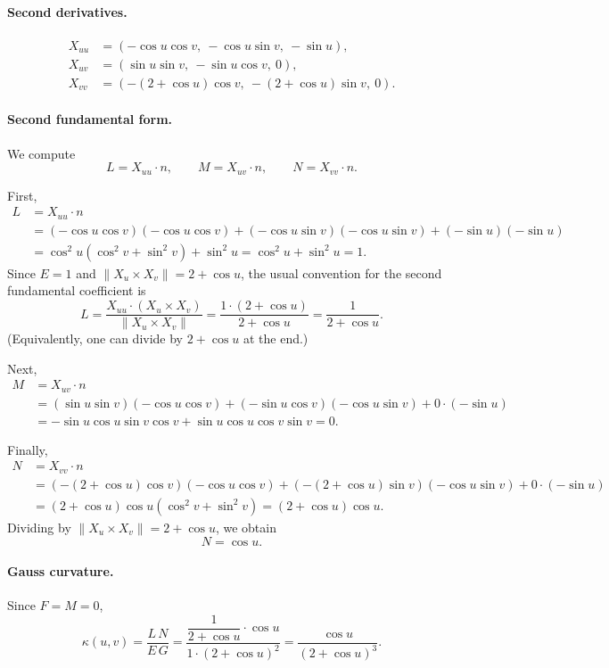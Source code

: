 \documentclass[12pt,a4paper]{article}
\theoremstyle{plain}
\theoremstyle{definition}      %
\begin{document}
\paragraph{Second derivatives.}
\[
\begin{aligned}
	X_{uu} &= (-\cos u\cos v,\ -\cos u\sin v,\ -\sin u),\\[1mm]
	X_{uv} &= (\sin u\sin v,\ -\sin u\cos v,\ 0),\\[1mm]
	X_{vv} &= (-(2+\cos u)\cos v,\ -(2+\cos u)\sin v,\ 0).
\end{aligned}
\]

\paragraph{Second fundamental form.}
We compute
\[
L = X_{uu}\cdot n,\qquad
M = X_{uv}\cdot n,\qquad
N = X_{vv}\cdot n.
\]

First,
\[
\begin{aligned}
	L
	&= X_{uu}\cdot n \\
	&= (-\cos u\cos v)(-\cos u\cos v)
	+(-\cos u\sin v)(-\cos u\sin v)
	+(-\sin u)(-\sin u) \\
	&= \cos^2u(\cos^2v+\sin^2v)+\sin^2u
	= \cos^2u+\sin^2u=1.
\end{aligned}
\]
Since $E=1$ and $\|X_u\times X_v\|=2+\cos u$, the usual convention for
the second fundamental coefficient is
\[
L = \frac{X_{uu}\cdot (X_u\times X_v)}{\|X_u\times X_v\|}
= \frac{1\cdot (2+\cos u)}{2+\cos u}
= \frac{1}{2+\cos u}.
\]
(Equivalently, one can divide by $2+\cos u$ at the end.)

Next,
\[
\begin{aligned}
	M
	&= X_{uv}\cdot n \\
	&= (\sin u\sin v)(-\cos u\cos v)
	+(-\sin u\cos v)(-\cos u\sin v)
	+0\cdot (-\sin u) \\
	&= -\sin u\cos u\sin v\cos v
	+\sin u\cos u\cos v\sin v
	= 0.
\end{aligned}
\]

Finally,
\[
\begin{aligned}
	N
	&= X_{vv}\cdot n \\
	&= (-(2+\cos u)\cos v)(-\cos u\cos v)
	+ (-(2+\cos u)\sin v)(-\cos u\sin v)
	+ 0\cdot(-\sin u) \\
	&= (2+\cos u)\cos u(\cos^2v+\sin^2v)
	= (2+\cos u)\cos u.
\end{aligned}
\]
Dividing by $\|X_u\times X_v\|=2+\cos u$, we obtain
\[
N = \cos u.
\]

\paragraph{Gauss curvature.}
Since $F=M=0$,
\[
\kappa(u,v) = \frac{L\,N}{E\,G}
= \frac{\dfrac{1}{2+\cos u}\cdot \cos u}
{1\cdot (2+\cos u)^2}
= \frac{\cos u}{(2+\cos u)^3}.
\]
\end{document}
